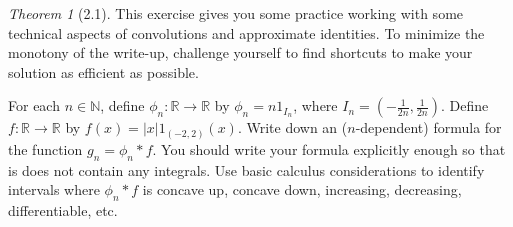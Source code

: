 \documentclass[12pt]{article}
\theoremstyle{remark}
\theoremstyle{named}
\newtheorem*{theorem}{Theorem}
\newcommand{\N}{\mathbb N}
\newcommand{\R}{\mathbb R}
\begin{document}
\begin{theorem}[2.1]
    This exercise gives you some practice working with some technical aspects of convolutions and approximate identities. To minimize the monotony of the write-up, challenge yourself to find shortcuts to make your solution as efficient as possible.
    
    For each \(n \in \N\), define \(\phi_n : \R \to \R\) by \(\phi_n = n 1_{I_n}\), where \(I_n = \left(-\frac{1}{2n}, \frac{1}{2n}\right)\). Define \(f : \R \to \R\) by \(f(x) = |x| 1_{(-2, 2)}(x)\). Write down an (\(n\)-dependent) formula for the function \(g_n = \phi_n * f\). You should write your formula explicitly enough so that is does not contain any integrals. Use basic calculus considerations to identify intervals where \(\phi_n * f\) is concave up, concave down, increasing, decreasing, differentiable, etc.
\end{theorem}
\end{document}
